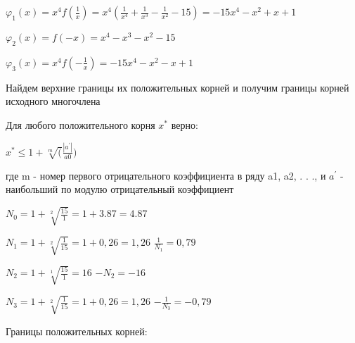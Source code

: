 \begin{math} 
\varphi_{1}(x)=x^{4}f(\frac1{x})=x^{4}(\frac1{x^{4}}+\frac1{x^{3}}-\frac1{x^{2}}-15)=-15x^{4}-x^{2}+x+1
\end{math}

\begin{math}
\varphi_{2}(x)=f(-x)=x^{4}-x^{3}-x^{2}-15
\end{math}

\begin{math} 
\varphi_{3}(x)=x^{4}f(-\frac1{x})=-15x^{4}-x^{2}-x+1
\end{math}

Найдем верхние границы их положительных корней и получим границы корней исходного многочлена

Для любого положительного корня \begin{math}
	x^{*} \end{math}  
верно: 

\begin{math} 
	x^{*}\leq1+\sqrt[m](\frac{|a^{'}|}{a0})
\end{math}

где m - номер первого отрицательного коэффициента в ряду a1, a2, . . ., и \begin{math}
a^{'}
\end{math} - наибольший по модулю отрицательный коэффициент

\begin{math} 
	N_{0}=1+\sqrt[2]{\frac{15}1}=1+3.87=4.87
\end{math}

\begin{math} 
	N_{1}=1+\sqrt[2]{\frac1{15}}=1+0,26=1,26
\end{math}
\begin{math} 
	\frac1{N_{1}}=0,79
\end{math}

\begin{math} 
	N_{2}=1+\sqrt[1]{\frac{15}1}=16
\end{math}
\begin{math} 
	-N_{2}=-16
\end{math}

\begin{math} 
	N_{3}=1+\sqrt[2]{\frac1{15}}=1+0,26=1,26
\end{math}
\begin{math} 
	-\frac1{N_{3}}=-0,79
\end{math}

Границы положительных корней: 
\begin{math} 
   [0,79;4,87]
\end{math}

